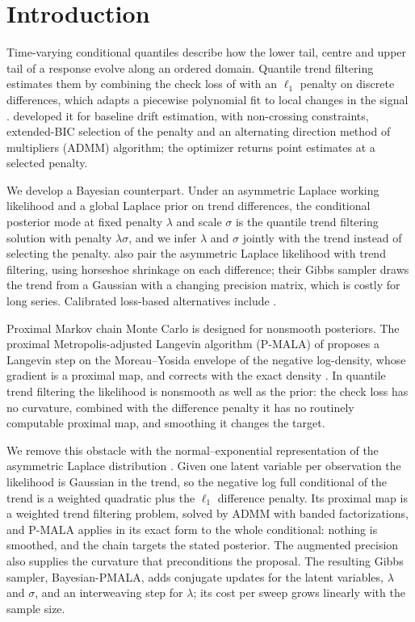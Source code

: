 \section{Introduction}
\label{sec:introduction}

Time-varying conditional quantiles describe how the lower tail, centre and upper tail of a response evolve along an ordered domain. Quantile trend filtering estimates them by combining the check loss of \citet{koenker1978regression} with an $\ell_1$ penalty on discrete differences, which adapts a piecewise polynomial fit to local changes in the signal \citep{tibshirani2014adaptive,madrid2022risk}. \citet{brantley2020baseline} developed it for baseline drift estimation, with non-crossing constraints, extended-BIC selection of the penalty and an alternating direction method of multipliers (ADMM) algorithm; the optimizer returns point estimates at a selected penalty.

We develop a Bayesian counterpart. Under an asymmetric Laplace working likelihood and a global Laplace prior on trend differences, the conditional posterior mode at fixed penalty $\lambda$ and scale $\sigma$ is the quantile trend filtering solution with penalty $\lambda\sigma$, and we infer $\lambda$ and $\sigma$ jointly with the trend instead of selecting the penalty. \citet{onizuka2024fast} also pair the asymmetric Laplace likelihood with trend filtering, using horseshoe shrinkage on each difference; their Gibbs sampler draws the trend from a Gaussian with a changing precision matrix, which is costly for long series. Calibrated loss-based alternatives include \citet{fasiolo2021fast}.

Proximal Markov chain Monte Carlo is designed for nonsmooth posteriors. The proximal Metropolis-adjusted Langevin algorithm (P-MALA) of \citet{pereyra2016proximal} proposes a Langevin step on the Moreau--Yosida envelope of the negative log-density, whose gradient is a proximal map, and corrects with the exact density \citep[see also][]{durmus2018efficient,heng2023bayesian}. In quantile trend filtering the likelihood is nonsmooth as well as the prior: the check loss has no curvature, combined with the difference penalty it has no routinely computable proximal map, and smoothing it changes the target.

We remove this obstacle with the normal--exponential representation of the asymmetric Laplace distribution \citep{kozumi2011gibbs}. Given one latent variable per observation the likelihood is Gaussian in the trend, so the negative log full conditional of the trend is a weighted quadratic plus the $\ell_1$ difference penalty. Its proximal map is a weighted trend filtering problem, solved by ADMM with banded factorizations, and P-MALA applies in its exact form to the whole conditional: nothing is smoothed, and the chain targets the stated posterior. The augmented precision also supplies the curvature that preconditions the proposal. The resulting Gibbs sampler, Bayesian-PMALA, adds conjugate updates for the latent variables, $\lambda$ and $\sigma$, and an interweaving step \citep{yu2011center} for $\lambda$; its cost per sweep grows linearly with the sample size.


